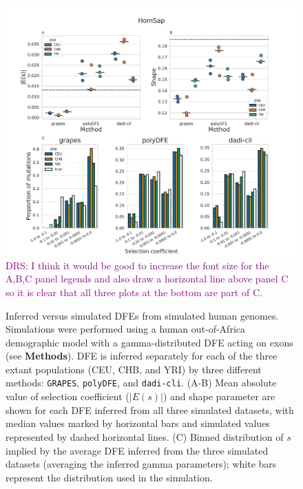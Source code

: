 \documentclass[hidelinks]{article}
\newcommand{\polydfe}{\texttt{polyDFE}\xspace}
\newcommand{\dadicli}{\texttt{dadi-cli}\xspace}
\newcommand{\grapes}{\texttt{GRAPES}\xspace}
\newcommand{\drscomment}[1]{\textcolor{purple}{DRS: #1}}
\begin{document}
    \begin{figure}[b!]
        \centering
        \includegraphics[width=\linewidth]{figures/HomSap/OOA/HomSap_discrete_DFE}
        \drscomment{I think it would be good to increase the font size for the A,B,C panel legends and also
        draw a horizontal line above panel C so it is clear that all three plots at the bottom are part of C.}
        \caption{Inferred versus simulated DFEs from simulated human genomes.
        Simulations were performed using a human out-of-Africa demographic model with a gamma-distributed DFE
        acting on exons (see \textbf{Methods}).
        DFE is inferred separately for each of the three extant populations (CEU, CHB, and YRI)
        by three different methods: \grapes, \polydfe , and \dadicli.
        (A-B) Mean absolute value of selection coefficient ($\lvert E(s) \rvert $) and shape parameter are
        shown for each DFE inferred from all three simulated datasets,
        with median values marked by horizontal bars
        and simulated values represented by dashed horizontal lines.
        (C) Binned distribution of $s$ implied by the average DFE inferred from the three simulated datasets (averaging the inferred gamma parameters);
        white bars represent the distribution used in the simulation.
        }
        \label{fig:homsap-dfe.ooa}
    \end{figure}

 
\end{document}
